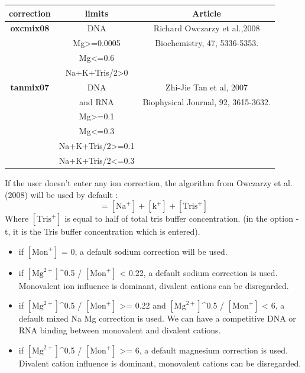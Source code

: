 \documentclass{article}
\begin{document}
\begin{table}[hc]
\begin{tabular}[h]{| c | c | c |}
\textbf{correction} & \textbf{limits} & \textbf{Article} \\
\hline 
\textbf{oxcmix08} & DNA & Richard Owczarzy et al.,2008 \\
 & Mg>=0.0005 & Biochemistry, 47, 5336-5353. \\
 & Mg<=0.6 & \\
 & Na+K+Tris/2>0 & \\
 \hline
\textbf{tanmix07} & DNA & Zhi-Jie Tan et al, 2007 \\
 & and RNA & Biophysical Journal, 92, 3615-3632.\\
 & Mg>=0.1 & \\
 & Mg<=0.3 & \\
 & Na+K+Tris/2>=0.1 & \\
 & Na+K+Tris/2<=0.3 & \\
 \hline
\end{tabular}
\end{table}

If the user doesn't enter any ion correction, the algorithm from Owczarzy et al. (2008) will
be used by default :
\begin{displaymath}
 [\mbox{Mon}^+] = [\mbox{Na}^+] + [\mbox{k}^+] + [\mbox{Tris}^+]
\end{displaymath}
Where $[\mbox{Tris}^+]$ is equal to half of total tris buffer concentration. (in the option -t, it is the Tris buffer concentration
which is entered).

\begin{itemize}
\item if $[\mbox{Mon}^+]$ = 0, a default sodium correction will be used.
\item if $[\mbox{Mg}^{2+}]$^0.5 / $[\mbox{Mon}^+]$ < 0.22, a default sodium correction is used.
Monovalent ion influence is dominant, divalent cations can be 
disregarded.
\item if $[\mbox{Mg}^{2+}]$^0.5 / $[\mbox{Mon}^+]$ >= 0.22 and $[\mbox{Mg}^{2+}]$^0.5 / $[\mbox{Mon}^+]$ < 6, 
a default mixed Na Mg correction is used.
We can have a competitive DNA or RNA binding between monovalent and divalent 
cations.
\item if $[\mbox{Mg}^{2+}]$^0.5 / $[\mbox{Mon}^+]$ >= 6, a default magnesium correction is used.
Divalent cation influence is dominant, monovalent cations can be 
disregarded.
\end{itemize}
\end{document}
